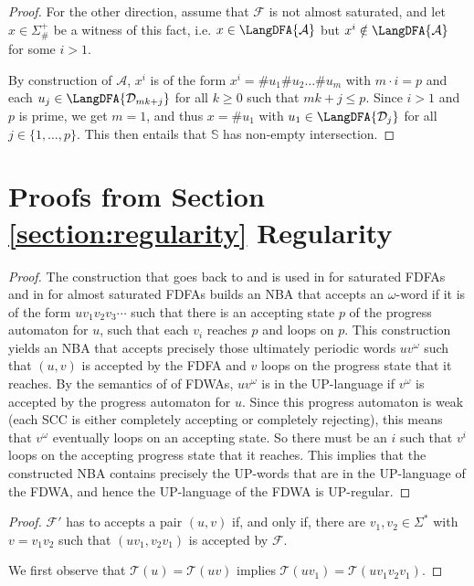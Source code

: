 \documentclass[a4paper,USenglish,cleveref,autoref,thm-restate]{lipics-v2021}
\newcommand{\mc}[1]{\ensuremath{\mathcal{#1}}}
\newcommand{\A}{\mc{A}}
\newcommand{\T}{\mc{T}}
\newcommand{\F}{\mc{F}}
\newcommand{\D}{\mc{D}}
\begin{document}
{\begin{proof}
 For the other direction, assume that $\F$ is not almost saturated, and let $x \in \Sigma_\#^+$ be a witness of this fact, i.e. $x \in \LangDFA{\A}$ but $x^i \notin \LangDFA{\A}$ for some $i > 1$.

  By construction of $\A$, $x^i$ is of the form $x^i = \#u_1\#u_2 \dots \# u_m$ with $m\cdot i=p$ and each $u_j \in \LangDFA{\D_{mk+j}}$ for all $k\ge 0$ such that $mk+j \le p$. Since $i > 1$ and $p$ is prime, we get $m=1$, and thus $x=\#u_1$ with $u_1 \in \LangDFA{\D_j}$ for all $j\in\{1,\ldots,p\}$.
  This then entails that $\mathbb{S}$ has non-empty intersection.
\end{proof}
 \section{Proofs from Section \ref{section:regularity} Regularity}
\label{section:appregularity}

\rstFDWAregular*
\begin{proof}
    The construction that goes back to \cite{CalbrixNP93} and is used in \cite{AngluinBF18} for saturated FDFAs and in \cite{LiST23} for almost saturated FDFAs builds an NBA that accepts an $\omega$-word if it is of the form $uv_1v_2v_3\cdots$ such that
    there is an accepting state $p$ of the progress automaton for $u$, such that each $v_i$ reaches $p$ and loops on $p$. This construction yields an NBA that accepts precisely those ultimately periodic words $uv^\omega$ such that $(u,v)$ is accepted by the FDFA and $v$ loops on the progress state that it reaches. By the semantics of of FDWAs, $uv^\omega$ is in the UP-language if $v^\omega$ is accepted by the progress automaton for $u$. Since this progress automaton is weak (each SCC is either completely accepting or completely rejecting), this means that $v^\omega$ eventually loops on an accepting state. So there must be an $i$ such that $v^i$ loops on the accepting progress state that it reaches. This implies that the constructed NBA contains precisely the UP-words that are in the UP-language of the FDWA, and hence the UP-language of the FDWA is UP-regular.
\end{proof}

\rststabilize*
\begin{proof}
    $\F'$ has to accepts a pair $(u,v)$ if, and only if, there are $v_1,v_2 \in \Sigma^*$ with $v=v_1v_2$ such that $(uv_1,v_2v_1)$ is accepted by $\F$.

    We first observe that $\T(u) = \T(uv)$ implies $\T(uv_1) = \T(uv_1 v_2v_1)$.


\end{proof}}
\end{document}
